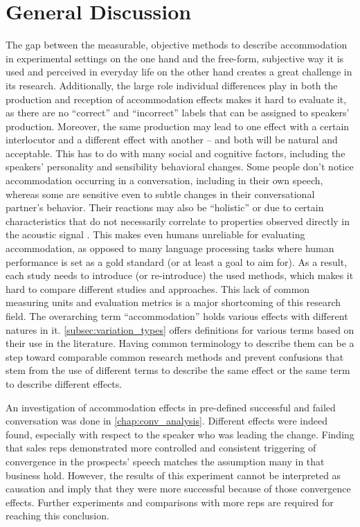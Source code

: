 \chapter*{General Discussion}
\label{chap:general_discussion}


\acresetall

The gap between the measurable, objective methods to describe accommodation in experimental settings on the one hand and the free-form, subjective way it is used and perceived in everyday life on the other hand creates a great challenge in its research.
Additionally, the large role individual differences play in both the production and reception of accommodation effects makes it hard to evaluate it, as there are no \enquote{correct} and \enquote{incorrect} labels that can be assigned to speakers' production.
Moreover, the same production may lead to one effect with a certain interlocutor and a different effect with another -- and both will be natural and acceptable.
This has to do with many social and cognitive factors, including the speakers' personality and sensibility behavioral changes.
Some people don't notice accommodation occurring in a conversation, including in their own speech, whereas some are sensitive even to subtle changes in their conversational partner's behavior.
Their reactions may also be \enquote{holistic} or due to certain characteristics that do not necessarily correlate to properties observed directly in the acoustic signal \citep{Babel2012role}.
This makes even humans unreliable for evaluating accommodation, as opposed to many language processing tasks where human performance is set as a gold standard (or at least a goal to aim for).
As a result, each study needs to introduce (or re-introduce) the used methods, which makes it hard to compare different studies and approaches.
This lack of common measuring units and evaluation metrics is a major shortcoming of this research field.
The overarching term \enquote{accommodation} holds various effects with different natures in it.
\cref{subsec:variation_types} offers definitions for various terms based on their use in the literature.
Having common terminology to describe them can be a step toward comparable common research methods and prevent confusions that stem from the use of different terms to describe the same effect or the same term to describe different effects. 

An investigation of accommodation effects in pre-defined successful and failed conversation was done in \cref{chap:conv_analysis}.
Different effects were indeed found, especially with respect to the speaker who was leading the change.
Finding that sales reps demonstrated more controlled and consistent triggering of convergence in the prospects' speech matches the assumption many in that business hold.
However, the results of this experiment cannot be interpreted as causation and imply that they were more successful because of those convergence effects.
Further experiments and comparisons with more reps are required for reaching this conclusion.

